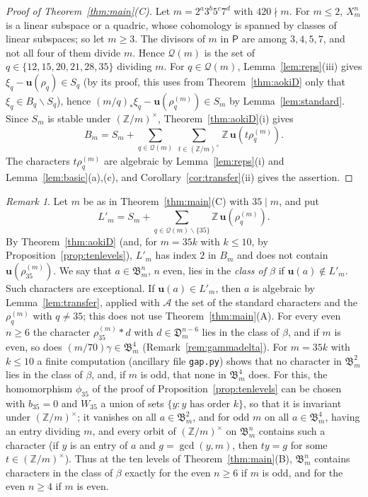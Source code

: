 \documentclass[11pt]{amsart}
\theoremstyle{definition}
\theoremstyle{remark}
\newtheorem{remark}[theorem]{Remark}
\numberwithin{equation}{section}
\newcommand{\Z}{\mathbb{Z}}
\newcommand{\fB}{\mathfrak{B}}
\newcommand{\fD}{\mathfrak{D}}
\newcommand{\cQ}{\mathcal{Q}}
\newcommand{\sP}{\mathsf{P}}
\newcommand{\uu}{\mathbf{u}}
\newcommand{\sm}{\smallsetminus}
\begin{document}
\begin{proof}[Proof of Theorem~\ref{thm:main}(C)]
Let $m=2^a3^b5^c7^d$ with $420\nmid m$. For $m\le2$, $X^n_m$ is a linear subspace or a quadric, whose cohomology is spanned by classes of linear subspaces; so let $m\ge3$. The divisors of $m$ in $\sP$ are among $3,4,5,7$, and not all four of them divide $m$. Hence $\cQ(m)$ is the set of $q\in\{12,15,20,21,28,35\}$ dividing $m$. For $q\in\cQ(m)$, Lemma~\ref{lem:reps}(iii) gives $\xi_q-\uu(\rho_q)\in S_q$ (by its proof, this uses from Theorem~\ref{thm:aokiD} only that $\xi_q\in B_q\sm S_q$), hence $(m/q)_*\xi_q-\uu(\rho^{(m)}_q)\in S_m$ by Lemma~\ref{lem:standard}. Since $S_m$ is stable under $(\Z/m)^\times$, Theorem~\ref{thm:aokiD}(i) gives
\[
B_m=S_m+\sum_{q\in\cQ(m)}\ \sum_{t\in(\Z/m)^\times}\Z\,\uu(t\rho^{(m)}_q).
\]
The characters $t\rho^{(m)}_q$ are algebraic by Lemma~\ref{lem:reps}(i) and Lemma~\ref{lem:basic}(a),(c), and Corollary~\ref{cor:transfer}(ii) gives the assertion.
\end{proof}

\begin{remark}\label{rem:new}
Let $m$ be as in Theorem~\ref{thm:main}(C) with $35\mid m$, and put
\[
L'_m=S_m+\sum_{q\in\cQ(m)\sm\{35\}}\Z\,\uu(\rho^{(m)}_q).
\]
By Theorem~\ref{thm:aokiD} (and, for $m=35k$ with $k\le10$, by Proposition~\ref{prop:tenlevels}), $L'_m$ has index $2$ in $B_m$ and does not contain $\uu(\rho^{(m)}_{35})$. We say that $a\in\fB^n_m$, $n$ even, lies in the \emph{class of $\beta$} if $\uu(a)\notin L'_m$. Such characters are exceptional. If $\uu(a)\in L'_m$, then $a$ is algebraic by Lemma~\ref{lem:transfer}, applied with $\mathcal A$ the set of the standard characters and the $\rho^{(m)}_q$ with $q\ne35$; this does not use Theorem~\ref{thm:main}(A). For every even $n\ge6$ the character $\rho^{(m)}_{35}*d$ with $d\in\fD^{n-6}_m$ lies in the class of $\beta$, and if $m$ is even, so does $(m/70)\gamma\in\fB^4_m$ (Remark~\ref{rem:gammadelta}). For $m=35k$ with $k\le10$ a finite computation (ancillary file \texttt{gap.py}) shows that no character in $\fB^2_m$ lies in the class of $\beta$, and, if $m$ is odd, that none in $\fB^4_m$ does. For this, the homomorphism $\phi_{35}$ of the proof of Proposition~\ref{prop:tenlevels} can be chosen with $b_{35}=0$ and $W_{35}$ a union of sets $\{y:y\text{ has order }k\}$, so that it is invariant under $(\Z/m)^\times$; it vanishes on all $a\in\fB^2_m$, and for odd $m$ on all $a\in\fB^4_m$, having an entry dividing $m$, and every orbit of $(\Z/m)^\times$ on $\fB^n_m$ contains such a character (if $y$ is an entry of $a$ and $g=\gcd(y,m)$, then $ty=g$ for some $t\in(\Z/m)^\times$). Thus at the ten levels of Theorem~\ref{thm:main}(B), $\fB^n_m$ contains characters in the class of $\beta$ exactly for the even $n\ge6$ if $m$ is odd, and for the even $n\ge4$ if $m$ is even.
\end{remark}
\end{document}

